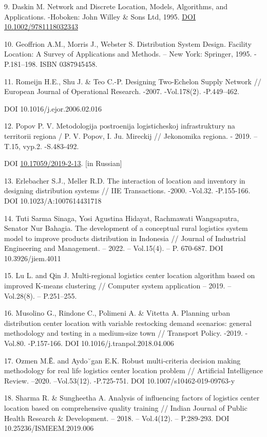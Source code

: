 \begin{references}
9. Daskin M. Network and Discrete Location, Models, Algorithms, and
Applications. -Hoboken: John Willey \& Sons Ltd, 1995.
\href{http://dx.doi.org/10.1002/9781118032343}{DOI
10.1002/9781118032343}

10. Geoffrion A.M., Morris J., Webster S. Distribution System Design.
Facility Location: A Survey of Applications and Methods. -- New York:
Springer, 1995. -P.181--198. ISBN 0387945458.

11. Romeijn H.E., Shu J. \& Teo C.-P. Designing Two-Echelon Supply
Network // European Journal of Operational Research. -2007. -Vol.178(2).
-P.449--462.

DOI 10.1016/j.ejor.2006.02.016

12. Popov P. V. Metodologija postroenija logisticheskoj infrastruktury na
territorii regiona / P. V. Popov, I. Ju. Mireckij // Jekonomika regiona.
- 2019. -- T.15, vyp.2. -S.483-492.

DOI \href{http://dx.doi.org/10.17059/2019-2-13}{10.17059/2019-2-13}.
{[}in Russian{]}

13. Erlebacher S.J., Meller R.D. The interaction of location and
inventory in designing distribution systems // IIE Transactions. -2000.
-Vol.32. -P.155-166. DOI 10.1023/A:1007614431718

14. Tuti Sarma Sinaga, Yosi Agustina Hidayat, Rachmawati Wangsaputra,
Senator Nur Bahagia. The development of a conceptual rural logistics
system model to improve products distribution in Indonesia // Journal of
Industrial Engineering and Management. -- 2022. -- Vol.15(4). -- P.
670-687. DOI 10.3926/jiem.4011

15. Lu L. and Qin J. Multi-regional logistics center location algorithm
based on improved K-means clustering // Computer system application --
2019. -- Vol.28(8). -- P.251--255.

16. Musolino G., Rindone C., Polimeni A. \& Vitetta A. Planning urban
distribution center location with variable restocking demand scenarios:
general methodology and testing in a medium-size town // Transport
Policy. -2019. -Vol.80. -P.157-166. DOI 10.1016/j.tranpol.2018.04.006

17. Ozmen M.Ё. and Aydo˘gan E.K. Robust multi-criteria decision making
methodology for real life logistics center location problem //
Artificial Intelligence Review. --2020. --Vol.53(12). -P.725-751. DOI
10.1007/s10462-019-09763-y

18. Sharma R. \& Sungheetha A. Analysis of influencing factors of
logistics center location based on comprehensive quality training //
Indian Journal of Public Health Research \& Development. -- 2018. --
Vol.4(12). -- P.289-293. DOI 10.25236/ISMEEM.2019.006


\end{references}
